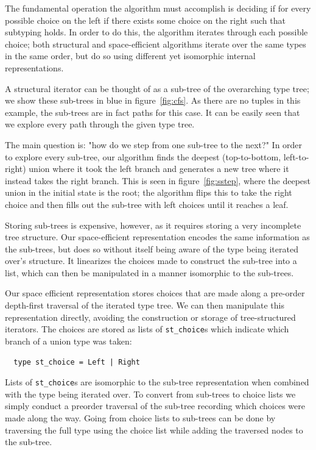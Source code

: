 \documentclass[a4paper,english]{lipics-v2019}
\begin{document}
The fundamental operation the algorithm must accomplish is deciding if
for every possible choice on the left if there exists some choice on the
right such that subtyping holds. In order to do this, the algorithm iterates
through each possible choice; both structural and space-efficient algorithms
iterate over the same types in the same order, but do so using different yet 
isomorphic internal representations.

A structural iterator can be thought of as a sub-tree of the overarching type
tree; we show these sub-trees in blue in figure~\ref{fig:cfs}. As there are no
tuples in this example, the sub-trees are in fact paths for this case. It can
be easily seen that we explore every path through the given type tree.

The main question is: "how do we step from one sub-tree to the next?" In order
to explore every sub-tree, our algorithm finds the deepest (top-to-bottom,
left-to-right) union where it took the left branch and generates a new tree
where it instead takes the right branch. This is seen in
figure~\ref{fig:sstep}, where the deepest union in the initial state is the
root; the algorithm flips this to take the right choice and then fills out the
sub-tree with left choices until it reaches a  leaf.

Storing sub-trees is expensive, however, as it requires storing a very incomplete
tree structure. Our space-efficient representation encodes the same information as 
the sub-trees, but does so without itself being aware of the type being iterated over's
structure. It linearizes the choices made to construct the sub-tree into a list, which
can then be manipulated in a manner isomorphic to the sub-trees.

Our space efficient representation stores choices that are made along a pre-order depth-first
traversal of the iterated type tree. We can then manipulate this representation directly, avoiding
the construction or storage of tree-structured iterators. The choices are stored as lists of 
\verb|st_choice|s which
indicate which branch of a union type was taken:
\begin{small}
\begin{verbatim}
  type st_choice = Left | Right
\end{verbatim}
\end{small}

Lists of \verb|st_choice|s are isomorphic to the sub-tree representation when
combined with the type being iterated over. To convert from sub-trees  to
choice lists we simply conduct a preorder traversal of the sub-tree recording
which choices were made along the way. Going from choice lists to sub-trees can
be done by traversing the full type using the choice list while adding the traversed
nodes to the sub-tree.
\end{document}
